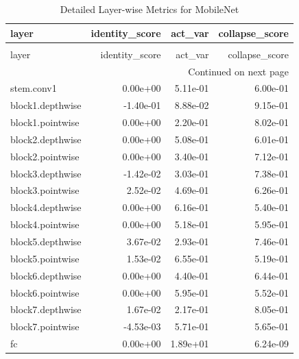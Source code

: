 \begin{longtable}{lrrr}
\caption{Detailed Layer-wise Metrics for MobileNet} \label{tab:layer_metrics_mobilenet} \\
\toprule
layer & identity_score & act_var & collapse_score \\
\midrule
\endfirsthead
\caption[]{Detailed Layer-wise Metrics for MobileNet} \\
\toprule
layer & identity_score & act_var & collapse_score \\
\midrule
\endhead
\midrule
\multicolumn{4}{r}{Continued on next page} \\
\midrule
\endfoot
\bottomrule
\endlastfoot
stem.conv1 & 0.00e+00 & 5.11e-01 & 6.00e-01 \\
block1.depthwise & -1.40e-01 & 8.88e-02 & 9.15e-01 \\
block1.pointwise & 0.00e+00 & 2.20e-01 & 8.02e-01 \\
block2.depthwise & 0.00e+00 & 5.08e-01 & 6.01e-01 \\
block2.pointwise & 0.00e+00 & 3.40e-01 & 7.12e-01 \\
block3.depthwise & -1.42e-02 & 3.03e-01 & 7.38e-01 \\
block3.pointwise & 2.52e-02 & 4.69e-01 & 6.26e-01 \\
block4.depthwise & 0.00e+00 & 6.16e-01 & 5.40e-01 \\
block4.pointwise & 0.00e+00 & 5.18e-01 & 5.95e-01 \\
block5.depthwise & 3.67e-02 & 2.93e-01 & 7.46e-01 \\
block5.pointwise & 1.53e-02 & 6.55e-01 & 5.19e-01 \\
block6.depthwise & 0.00e+00 & 4.40e-01 & 6.44e-01 \\
block6.pointwise & 0.00e+00 & 5.95e-01 & 5.52e-01 \\
block7.depthwise & 1.67e-02 & 2.17e-01 & 8.05e-01 \\
block7.pointwise & -4.53e-03 & 5.71e-01 & 5.65e-01 \\
fc & 0.00e+00 & 1.89e+01 & 6.24e-09 \\
\end{longtable}
